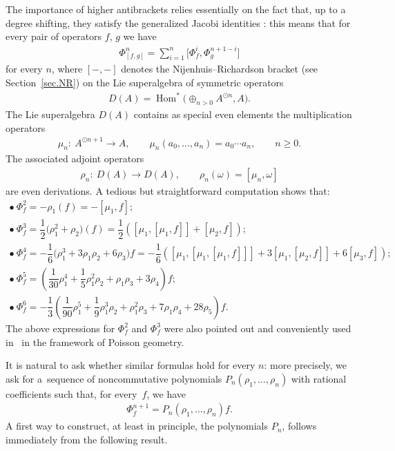 \documentclass[pdftex]{sigma}
\newcommand{\Hom}{\operatorname{Hom}}
\numberwithin{equation}{section}
\begin{document}
The importance of higher antibrackets relies essentially on the fact that, up to a degree shifting, they satisfy the generalized Jacobi identities \cite{BDA,kravchenko2000}: this means that for every pair of operators
$f$, $g$ we have
\begin{gather*} \Phi^{n}_{[f,g]}=\sum_{i=1}^n\big[\Phi_f^i,\Phi_g^{n+1-i}\big]\end{gather*}
for every $n$, where $[-,-]$ denotes the Nijenhuis--Richardson bracket (see Section~\ref{sec.NR}) on the Lie superalgebra of symmetric operators
\begin{gather*}D(A)=\Hom^*\big(\oplus_{n>0}A^{\odot n},A\big) .\end{gather*}
The Lie superalgebra $D(A)$ contains as special even elements the multiplication operators
\begin{gather*} \mu_n\colon \ A^{\odot n+1}\to A,\qquad \mu_n(a_0,\ldots,a_n)=a_0\cdots a_n ,\qquad n\ge 0 .\end{gather*}
The associated adjoint operators
\begin{gather*} \rho_n\colon \ D(A)\to D(A),\qquad \rho_n(\omega)=[\mu_n,\omega]  \end{gather*}
are even derivations. A tedious but straightforward computation shows that:
\begin{gather*}
\bullet \ \Phi^2_f=-\rho_1(f)=-[\mu_1,f];\\
\bullet \ \Phi^3_f=\dfrac{1}{2}\big(\rho_1^2+\rho_2\big)(f)=\dfrac{1}{2}([\mu_1,[\mu_1,f]]+[\mu_2,f]);\\
\bullet \ \Phi^4_f=-\dfrac{1}{6}\big(\rho_1^3+3\rho_1\rho_2+6\rho_3\big)f=
-\dfrac{1}{6}([\mu_1,[\mu_1,[\mu_1,f]]]+3[\mu_1,[\mu_2,f]]+6[\mu_3,f]);\\
\bullet \ \Phi^5_f=\left(\dfrac{1}{30}\rho_1^4+\dfrac{1}{5}\rho_1^2\rho_2+\rho_1\rho_3+3\rho_4\right)f;\\
\bullet \ \Phi^6_f=-\dfrac{1}{3}\left(\dfrac{1}{90}\rho_1^5+\dfrac{1}{9}\rho_1^3\rho_2+\rho_1^2\rho_3+7\rho_1\rho_4+28\rho_5\right)f.
\end{gather*}
The above expressions for $\Phi^2_f$ and $\Phi^3_f$ were also pointed out and conveniently used in~\cite{FMpoisson} in the framework of Poisson geometry.

It is natural to ask whether similar formulas hold for every $n$: more precisely, we ask for a~sequence of noncommutative polynomials $P_n(\rho_1,\ldots,\rho_n)$ with rational coef\/f\/icients such that, for every~$f$, we have
\begin{gather}\label{equ.polinomigeneratori}
 \Phi_f^{n+1}=P_n(\rho_1,\ldots,\rho_n)f .
 \end{gather}
A f\/irst way to construct, at least in principle, the polynomials $P_n$, follows immediately from the following result.
\end{document}
